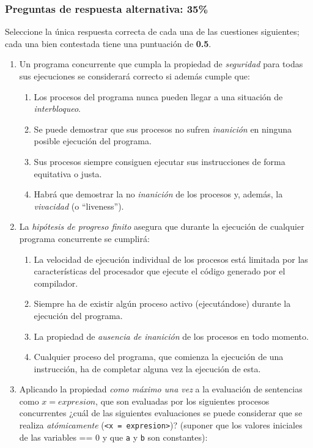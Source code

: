 \documentclass[12pt]{article}
\begin{document}
    \subsubsection*{Preguntas de respuesta alternativa: 35\%}
    \begin{ejercicio}
        Seleccione la única respuesta correcta de cada una de las cuestiones siguientes; cada una bien contestada tiene una puntuación de \textbf{0.5}.
        \begin{enumerate}
            \item Un programa concurrente que cumpla la propiedad de \textit{seguridad} para todas sus ejecuciones se considerará correcto si además cumple que:
                \begin{enumerate}[label=(\alph*)]
                    \item Los procesos del programa nunca pueden llegar a una situación de \textit{interbloqueo}.
                    \item Se puede demostrar que sus procesos no sufren \textit{inanición} en ninguna posible ejecución del programa.
                    \item Sus procesos siempre consiguen ejecutar sus instrucciones de forma equitativa o justa.
                    \item Habrá que demostrar la no \textit{inanición} de los procesos y, además, la \textit{vivacidad} (o ``liveness'').
                \end{enumerate}
            \item La \textit{hipótesis de progreso finito} asegura que durante la ejecución de cualquier programa concurrente se cumplirá:
                \begin{enumerate}[label=(\alph*)]
                    \item La velocidad de ejecución individual de los procesos está limitada por las características del procesador que ejecute el código generado por el compilador.
                    \item Siempre ha de existir algún proceso activo (ejecutándose) durante la ejecución del programa.
                    \item La propiedad de \textit{ausencia de inanición} de los procesos en todo momento.
                    \item Cualquier proceso del programa, que comienza la ejecución de una instrucción, ha de completar alguna vez la ejecución de esta.
                \end{enumerate}
            \item Aplicando la propiedad \textit{como máximo una vez} a la evaluación de sentencias como $x=expresion$, que son evaluadas por los siguientes procesos concurrentes ¿cuál de las siguientes evaluaciones se puede considerar que se realiza \textit{atómicamente} (\verb|<x = expresion>|)? (suponer que los valores iniciales de las variables == 0 y que \verb|a| y \verb|b| son constantes):

\end{enumerate}
\end{ejercicio}
\end{document}
